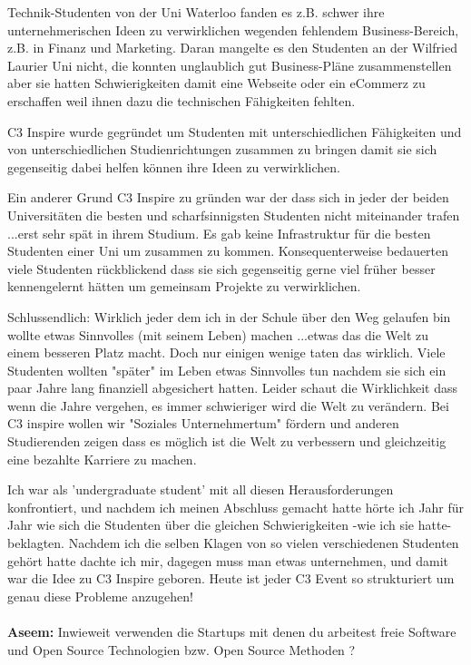 \documentclass[10pt,a4paper,ngerman,twoside]{article} %
\begin{document}
\begin{multicols}{3}
Technik-Studenten von der Uni Waterloo fanden es z.B. schwer ihre 
unternehmerischen Ideen zu verwirklichen wegenden fehlendem 
Business-Bereich, z.B. in Finanz und Marketing. 
Daran mangelte es den Studenten an der Wilfried Laurier Uni nicht, die 
konnten unglaublich gut Business-Pläne zusammenstellen aber sie hatten 
Schwierigkeiten damit eine Webseite oder ein eCommerz zu erschaffen 
weil ihnen dazu die technischen Fähigkeiten fehlten. 

C3 Inspire wurde gegründet um Studenten mit unterschiedlichen 
Fähigkeiten und von unterschiedlichen Studienrichtungen zusammen zu 
bringen damit sie sich gegenseitig dabei helfen können ihre Ideen zu 
verwirklichen. 

Ein anderer Grund C3 Inspire zu gründen war der dass sich in jeder der 
beiden Universitäten die besten und scharfsinnigsten Studenten nicht 
miteinander trafen ...erst sehr spät in ihrem Studium. Es gab keine 
Infrastruktur für die besten Studenten einer Uni um zusammen zu kommen. 
Konsequenterweise bedauerten viele Studenten rückblickend dass sie 
sich gegenseitig gerne viel früher besser kennengelernt hätten um 
gemeinsam Projekte zu verwirklichen. 

Schlussendlich: Wirklich jeder dem ich in der Schule über den Weg 
gelaufen bin wollte etwas Sinnvolles (mit seinem Leben) machen ...etwas 
das die Welt zu einem besseren Platz macht. Doch nur einigen wenige 
taten das wirklich. Viele Studenten wollten "später" im Leben etwas 
Sinnvolles tun nachdem sie sich ein paar Jahre lang finanziell 
abgesichert hatten. Leider schaut die Wirklichkeit dass wenn die 
Jahre vergehen, es immer schwieriger wird die Welt zu verändern. Bei 
C3 inspire wollen wir "Soziales Unternehmertum" fördern und anderen 
Studierenden zeigen dass es möglich ist die Welt zu verbessern und 
gleichzeitig eine bezahlte Karriere zu machen. 

Ich war als 'undergraduate student' mit all diesen Herausforderungen 
konfrontiert, und nachdem ich meinen Abschluss gemacht hatte hörte ich 
Jahr für Jahr wie sich die Studenten über die gleichen 
Schwierigkeiten -wie ich sie hatte- beklagten. Nachdem ich die selben 
Klagen von so vielen verschiedenen Studenten gehört hatte dachte ich  
mir, dagegen muss man etwas unternehmen, und damit war die Idee zu C3 
Inspire geboren. Heute ist jeder C3 Event so strukturiert um genau 
diese Probleme anzugehen! 

\paragraph{}
\textbf{Aseem:} Inwieweit verwenden die Startups mit denen du arbeitest freie 
Software und Open Source Technologien bzw. Open Source Methoden ?


\end{multicols}
\end{document}
